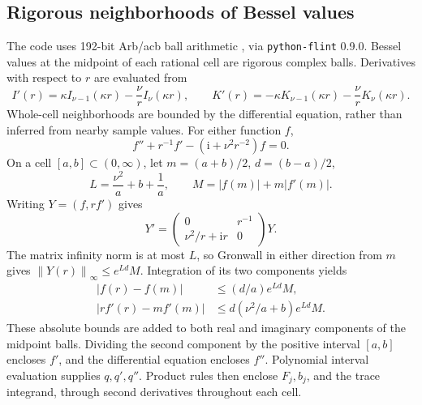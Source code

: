 \documentclass[11pt,a4paper]{article}
\theoremstyle{definition}\newtheorem{definition}[theorem]{Definition}
\theoremstyle{remark}\newtheorem{remark}[theorem]{Remark}
\newcommand{\ii}{\mathrm i}
\newcommand{\norm}[1]{\left\|#1\right\|}
\begin{document}
\subsection{Rigorous neighborhoods of Bessel values}
The code uses 192-bit Arb/acb ball arithmetic \cite{Arb}, via \texttt{python-flint} 0.9.0. Bessel values at the midpoint of each rational cell are rigorous complex balls. Derivatives with respect to \(r\) are evaluated from
\[
 I'(r)=\kappa I_{\nu-1}(\kappa r)-\frac\nu r I_\nu(\kappa r),\qquad
 K'(r)=-\kappa K_{\nu-1}(\kappa r)-\frac\nu r K_\nu(\kappa r).
\]
Whole-cell neighborhoods are bounded by the differential equation, rather than inferred from nearby sample values. For either function \(f\),
\[
 f''+r^{-1}f'-(\ii+\nu^2r^{-2})f=0.
\]
On a cell \([a,b]\subset(0,\infty)\), let \(m=(a+b)/2\), \(d=(b-a)/2\),
\[
 L=\frac{\nu^2}a+b+\frac1a,
 \qquad M=|f(m)|+m|f'(m)|.
\]
Writing \(Y=(f,rf')\) gives
\[
 Y'=\begin{pmatrix}0&r^{-1}\\\nu^2/r+\ii r&0\end{pmatrix}Y.
\]
The matrix infinity norm is at most \(L\), so Gronwall in either direction from \(m\) gives \(\norm{Y(r)}_\infty\le e^{Ld}M\). Integration of its two components yields
\begin{align}
 |f(r)-f(m)|&\le(d/a)e^{Ld}M,\label{eq:besselerr1}\\
 |rf'(r)-mf'(m)|&\le d(\nu^2/a+b)e^{Ld}M.\label{eq:besselerr2}
\end{align}
These absolute bounds are added to both real and imaginary components of the midpoint balls. Dividing the second component by the positive interval \([a,b]\) encloses \(f'\), and the differential equation encloses \(f''\). Polynomial interval evaluation supplies \(q,q',q''\). Product rules then enclose \(F_j,b_j\), and the trace integrand, through second derivatives throughout each cell.
\end{document}
